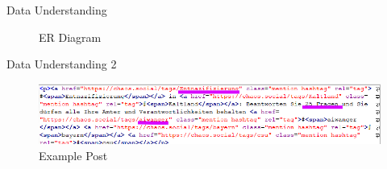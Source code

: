 \documentclass[usenames,dvipsnames,aspectratio=169]{beamer}
\begin{document}
	\begin{frame}{Data Understanding}
		
		\begin{figure}[htbp]
			\centering
			\resizebox{\columnwidth}{!}{}
			\caption{ER Diagram}
		\end{figure}
		
	\end{frame}
	
	\begin{frame}{Data Understanding 2}
		\begin{figure}[htbp]
		\centering
		\includegraphics[width=\linewidth]{pictures/example_posts.png}
		\caption{Example Post}
		\end{figure}
	\end{frame}
	
\end{document}
